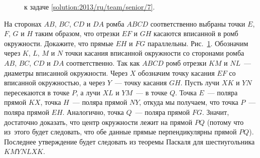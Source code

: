\ifsolution
\begin{figure}\centering
    \caption{к задаче \ref{solution:2013/ru/team/senior/7}.}
    \label{fig:solution:2013/ru/team/senior/7}
\end{figure}
\fi %

\problem{}
На сторонах $AB$, $BC$, $CD$ и $DA$ ромба $ABCD$ соответственно выбраны точки
$E$, $F$, $G$ и $H$ таким образом, что отрезки $EF$ и $GH$ касаются вписанной в
ромб окружности.
Докажите, что прямые $EH$ и $FG$ параллельны.
\solution
\label{solution:2013/ru/team/senior/7}
Рис.~\ref{fig:solution:2013/ru/team/senior/7}.
Обозначим через $K$, $L$, $M$ и $N$ точки касания вписанной окружности со
сторонами ромба $AB$, $BC$, $CD$ и $DA$ соответственно.
Так как $ABCD$ ромб отрезки $KM$ и $NL$~--- диаметры вписанной окружности.
Через $X$ обозначим точку касания $EF$ со вписанной окружностью, а через
$Y$~--- точку касания $GH$.
Пусть лучи $XK$ и $YN$ пересекаются в точке $P$, а лучи $XL$ и $YM$~--- в точке
$Q$.
Точка $E$~--- поляра прямой $KX$, точка $H$~--- поляра прямой $NY$, откуда мы
получаем, что точка $P$~--- поляра прямой $EH$.
Аналогично, точка $Q$~--- поляра прямой $FG$.
Значит, достаточно доказать, что центр окружности лежит на прямой $PQ$
(потому что из~этого будет следовать, что обе данные прямые перпендикулярны
прямой $PQ$).
Последнее утверждение будет следовать из теоремы Паскаля для шестиугольника
$KMYNLXK$.
\endproblem
